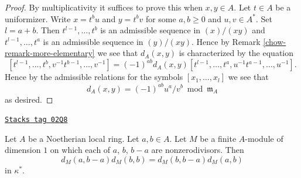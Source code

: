 \begin{proof}

By multiplicativity it suffices to prove this when $x, y \in A$.
Let $t \in A$ be a uniformizer.
Write $x = t^bu$ and $y = t^bv$ for some $a, b \geq 0$
and $u, v \in A^*$. Set $l = a + b$. Then
$t^{l - 1}, \ldots, t^b$ is an admissible sequence in
$(x)/(xy)$ and $t^{l - 1}, \ldots, t^a$ is an admissible
sequence in $(y)/(xy)$. Hence by Remark \ref{chow-remark-more-elementary}
we see that $d_A(x, y)$ is characterized by the equation
$$
[t^{l - 1}, \ldots, t^b, v^{-1}t^{b - 1}, \ldots, v^{-1}]
=
(-1)^{ab} d_A(x, y)
[t^{l - 1}, \ldots, t^a, u^{-1}t^{a - 1}, \ldots, u^{-1}].
$$
Hence by the admissible relations for the
symbols $[x_1, \ldots, x_l]$ we see that
$$
d_A(x, y) = (-1)^{ab} u^a/v^b \bmod \mathfrak m_A
$$
as desired.
\end{proof}

\begin{lemma}
\label{chow-lemma-symbol-is-steinberg-prepare}
\href{https://stacks.math.columbia.edu/tag/02Q8}{\texttt{Stacks tag 02Q8}}

Let $A$ be a Noetherian local ring.
Let $a, b \in A$.
Let $M$ be a finite $A$-module of dimension $1$ on
which each of $a$, $b$, $b - a$ are nonzerodivisors.
Then
$$
d_M(a, b - a)d_M(b, b) = d_M(b, b - a)d_M(a, b)
$$
in $\kappa^*$.
\end{lemma}


